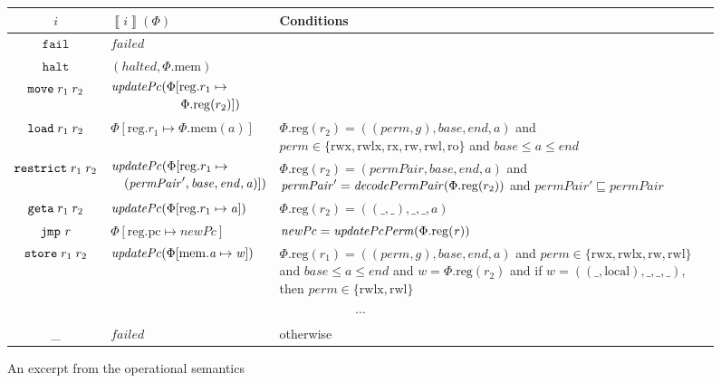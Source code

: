 \documentclass[compsoc,conference,letterpaper,fleqn]{IEEEtran}
\newcommand{\update}[2]{[#1 \mapsto #2]}
\newcommand{\sem}[1]{\left\llbracket #1 \right\rrbracket}
\newcommand{\var}[1]{\mathit{#1}}
\newcommand{\lv}{\var{r}}
\newcommand{\gl}{\var{g}}
\newcommand{\pcreg}{\mathrm{pc}}
\newcommand{\addr}{\var{a}}
\newcommand{\start}{\var{base}}
\newcommand{\addrend}{\var{end}}
\newcommand{\perm}{\var{perm}}
\newcommand{\permp}{\var{permPair}}
\newcommand{\stdcap}[1][(\perm,\gl)]{\left(#1,\start,\addrend,\addr \right)}
\newcommand{\plainproj}[1]{\mathrm{#1}}
\newcommand{\memheap}[1][\Phi]{#1.\plainproj{mem}}
\newcommand{\memreg}[1][\Phi]{#1.\plainproj{reg}}
\newcommand{\updateHeap}[3][\Phi]{#1\update{\plainproj{mem}.#2}{#3}}
\newcommand{\updateReg}[3][\Phi]{#1\update{\plainproj{reg}.#2}{#3}}
\newcommand{\failed}{\mathit{failed}}
\newcommand{\halted}{\mathit{halted}}
\newcommand{\plainfun}[2]{
  \ifthenelse{\equal{#2}{}}
  {\mathit{#1}}
  {\mathit{#1}(#2)}
}
\newcommand{\decodePermPair}{\plainfun{decodePermPair}}
\newcommand{\updatePcPerm}[1]{\plainfun{updatePcPerm}{#1}}
\newcommand{\stdUpdatePc}[1]{\plainfun{updatePc}{#1}}
\newcommand{\refreg}[1]{#1}
\newcommand{\refheap}[1]{#1}
\newcommand{\zinstr}[1]{\mathtt{#1}}
\newcommand{\fail}{\zinstr{fail}}
\newcommand{\halt}{\zinstr{halt}}
\newcommand{\oneinstr}[2]{
  \ifthenelse{\equal{#2}{}}
  {\zinstr{#1}}
  {\zinstr{#1} \; #2}
}
\newcommand{\jmp}[1]{\oneinstr{jmp}{#1}}
\newcommand{\twoinstr}[3]{
  \ifthenelse{\equal{#2#3}{}}
  {\zinstr{#1}}
  {\zinstr{#1} \; #2 \; #3}
}
\newcommand{\restricttwo}[2]{\twoinstr{restrict}{#1}{#2}}
\newcommand{\geta}[2]{\twoinstr{geta}{#1}{#2}}
\newcommand{\move}[2]{\twoinstr{move}{#1}{#2}}
\newcommand{\store}[2]{\twoinstr{store}{#1}{#2}}
\newcommand{\load}[2]{\twoinstr{load}{#1}{#2}}
\newcommand{\plainperm}[1]{\mathrm{#1}}
\newcommand{\readonly}{\plainperm{ro}}
\newcommand{\readwrite}{\plainperm{rw}}
\newcommand{\exec}{\plainperm{rx}}
\newcommand{\rwx}{\plainperm{rwx}}
\newcommand{\readwritel}{\plainperm{rwl}}
\newcommand{\rwlx}{\plainperm{rwlx}}
\newcommand{\local}{\plainperm{local}}
\begin{document}
\begin{figure}
  \begin{tabular}{|c|p{3.8cm}|p{10.4cm}|}
    \hline
    $i$&$\sem{i}(\Phi)$&Conditions\\
    \hline 
    $\fail$&$\failed$&\\
    \hline
    $\halt$&$(\halted,\memheap)$&\\
    \hline
    $\move{\refreg{r_1}}{r_2}$& $\begin{multlined}
      \stdUpdatePc{}(\updateReg{r_1}{\\
          \memreg(r_2)}) \end{multlined}$&\\
    \hline
    $\load{\refreg{r_1}}{\refheap{r_2}}$&$\updateReg{r_1}{\memheap(\addr)}$&$\memreg(r_2) = \stdcap$\footnotesize{ and }$\perm \in \{ \rwx, \rwlx, \exec, \readwrite, \readwritel, \readonly \}$\footnotesize{ and }$\start \leq \addr \leq \addrend$\\
    \hline
    $\restricttwo{\refreg{r_1}}{r_2}$&$\begin{multlined}
                                       \stdUpdatePc{}(\updateReg{r_1}{\\(\permp',\start,\addrend,\addr)})
                                     \end{multlined}$  &
                                                        $\memreg(r_2) = \stdcap[\permp]$\footnotesize{ and }\newline$\permp' = \decodePermPair{\memreg(r_2)}$
                                                      \footnotesize{ and }$\permp'\sqsubseteq \permp$\\
    \hline
    $\geta{\refreg{r_1}}{\refreg{r_2}}$ & $\stdUpdatePc{\updateReg{r_1}{\addr}}$ &
                                                $\memreg(r_2) = ((\_,\_),\_,\_,\addr)$\\
    \hline
    $\jmp{\lv}$&$\updateReg{\pcreg}{\var{newPc}}$&$\var{newPc} = \updatePcPerm{\memreg(\lv)}$\\
    \hline
    $\store{\refheap{r_1}}{\refreg{r_2}}$&$\stdUpdatePc{\updateHeap{\addr}{\var{w}}}$&$\memreg(r_1) = \stdcap$\footnotesize{ and }$\perm \in \{ \rwx, \rwlx, \readwrite, \readwritel\}$ \footnotesize{ and } $\start \leq \addr \leq \addrend$\footnotesize{ and }$\var{w} = \memreg(r_2)$
                                                                                       \footnotesize{and if }$\var{w} = ((\_,\local),\_,\_,\_)$\footnotesize{, then  }$\perm \in \{\rwlx,\readwritel \}$\\
    \hline
    \multicolumn{3}{|c|}{$\cdots$}\\
    \hline
    \_&$\failed$&\footnotesize{otherwise}\\
    \hline
  \end{tabular}
  \caption{An excerpt from the operational semantics}
  \label{fig:op-sem}
\end{figure}
\end{document}
